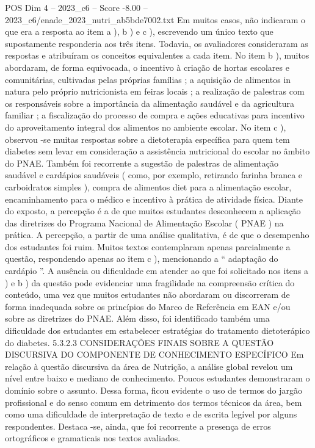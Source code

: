 \begin{textsample}{POS Dim 4 – 2023\_c6 – Score -8.00 – 2023\_c6/enade\_2023\_nutri\_ab5bde7002.txt}
Em muitos casos, não indicaram o que era a resposta ao item a ), b ) e c ), escrevendo um único texto que supostamente responderia aos três itens.
Todavia, os avaliadores consideraram as respostas e atribuíram os conceitos equivalentes a cada item.
No item b ), muitos abordaram, de forma equivocada, o incentivo à criação de hortas escolares e comunitárias, cultivadas pelas próprias famílias ; a aquisição de alimentos in natura pelo próprio nutricionista em feiras locais ; a realização de palestras com os responsáveis sobre a importância da alimentação saudável e da agricultura familiar ; a fiscalização do processo de compra e ações educativas para incentivo do aproveitamento integral dos alimentos no ambiente escolar.
No item c ), observou -se muitas respostas sobre a dietoterapia específica para quem tem diabetes sem levar em consideração a assistência nutricional do escolar no âmbito do PNAE.
Também foi recorrente a sugestão de palestras de alimentação saudável e cardápios saudáveis ( como, por exemplo, retirando farinha branca e carboidratos simples ), compra de alimentos diet para a alimentação escolar, encaminhamento para o médico e incentivo à prática de atividade física.
Diante do exposto, a percepção é a de que muitos estudantes desconhecem a aplicação das diretrizes do Programa Nacional de Alimentação Escolar ( PNAE ) na prática.
A percepção, a partir de uma análise qualitativa, é de que o desempenho dos estudantes foi ruim.
Muitos textos contemplaram apenas parcialmente a questão, respondendo apenas ao item c ), mencionando a “ adaptação do cardápio ”.
A ausência ou dificuldade em atender ao que foi solicitado nos itens a ) e b ) da questão pode evidenciar uma fragilidade na compreensão crítica do conteúdo, uma vez que muitos estudantes não abordaram ou discorreram de forma inadequada sobre os princípios do Marco de Referência em EAN e/ou sobre as diretrizes do PNAE.
Além disso, foi identificado também uma dificuldade dos estudantes em estabelecer estratégias do tratamento dietoterápico do diabetes. 5.3.2.3 CONSIDERAÇÕES FINAIS SOBRE A QUESTÃO DISCURSIVA DO COMPONENTE DE CONHECIMENTO ESPECÍFICO Em relação à questão discursiva da área de Nutrição, a análise global revelou um nível entre baixo e mediano de conhecimento.
Poucos estudantes demonstraram o domínio sobre o assunto.
Dessa forma, ficou evidente o uso de termos do jargão profissional e do senso comum em detrimento dos termos técnicos da área, bem como uma dificuldade de interpretação de texto e de escrita legível por alguns respondentes.
Destaca -se, ainda, que foi recorrente a presença de erros ortográficos e gramaticais nos textos avaliados.

\end{textsample}
